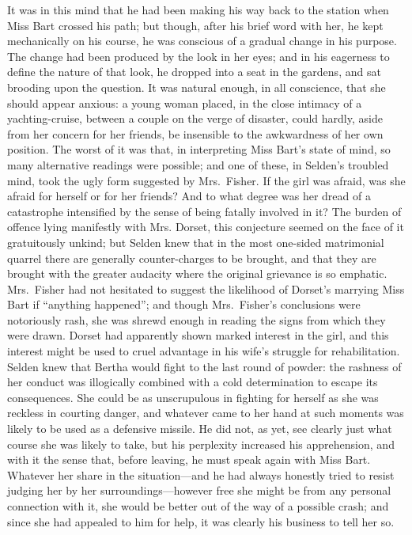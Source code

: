 \documentclass[12pt,a4paper]{book}
\begin{document}
It was in this mind that he had been making his way back to the
station when Miss Bart crossed his path; but though, after his
brief word with her, he kept mechanically on his course, he was
conscious of a gradual change in his purpose. The change had been
produced by the look in her eyes; and in his eagerness to define
the nature of that look, he dropped into a seat in the gardens,
and sat brooding upon the question. It was natural enough, in all
conscience, that she should appear anxious: a young woman
placed, in the close intimacy of a yachting-cruise, between a
couple on the verge of disaster, could hardly, aside from her
concern for her friends, be insensible to the awkwardness of her
own position. The worst of it was that, in interpreting Miss
Bart's state of mind, so many alternative readings were possible;
and one of these, in Selden's troubled mind, took the ugly form
suggested by Mrs.\ Fisher. If the girl was afraid, was she afraid
for herself or for her friends? And to what degree was her dread
of a catastrophe intensified by the sense of being fatally
involved in it? The burden of offence lying manifestly with Mrs.
Dorset, this conjecture seemed on the face of it gratuitously
unkind; but Selden knew that in the most one-sided matrimonial
quarrel there are generally counter-charges to be brought, and
that they are brought with the greater audacity where the
original grievance is so emphatic. Mrs.\ Fisher had not hesitated
to suggest the likelihood of Dorset's marrying Miss Bart if
``anything happened''; and though Mrs.\ Fisher's conclusions were
notoriously rash, she was shrewd enough in reading the signs from
which they were drawn. Dorset had apparently shown marked
interest in the girl, and this interest might be used to cruel
advantage in his wife's struggle for rehabilitation. Selden knew
that Bertha would fight to the last round of powder: the rashness
of her conduct was illogically combined with a cold determination
to escape its consequences. She could be as unscrupulous in
fighting for herself as she was reckless in courting danger, and
whatever came to her hand at such moments was likely to be used
as a defensive missile. He did not, as yet, see clearly just what
course she was likely to take, but his perplexity increased his
apprehension, and with it the sense that, before leaving, he must
speak again with Miss Bart. Whatever her share in the
situation---and he had always honestly tried to resist judging her
by her surroundings---however free she might be from any personal
connection with it, she would be better out of the way of a
possible crash; and since she had appealed to him for help, it
was clearly his business to tell her so.
\end{document}
